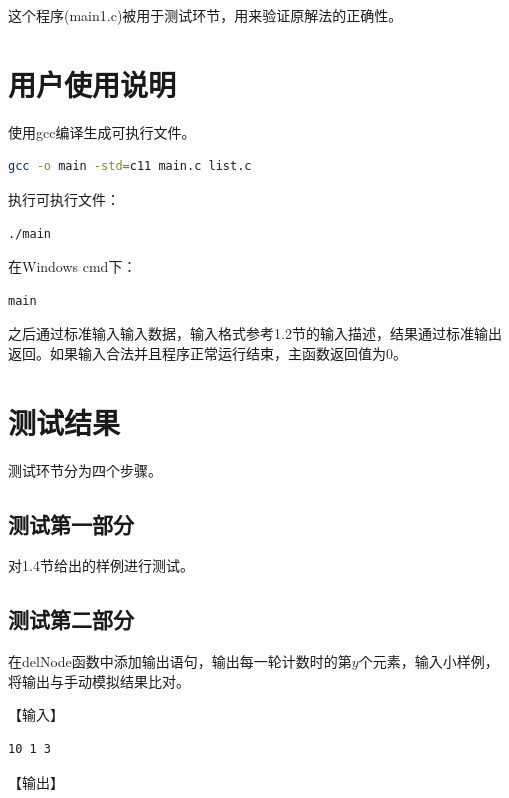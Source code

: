 \documentclass{article}
\begin{document}
这个程序(main1.c)被用于测试环节，用来验证原解法的正确性。

\section{用户使用说明}

使用gcc编译生成可执行文件。

\begin{lstlisting}[language={bash},
    basicstyle=\small\consolas]
gcc -o main -std=c11 main.c list.c
\end{lstlisting}

执行可执行文件：

\begin{lstlisting}[language={bash},
    basicstyle=\small\consolas]
./main
\end{lstlisting}

在Windows cmd下：

\begin{lstlisting}[language={bash},
    basicstyle=\small\consolas]
main
\end{lstlisting}

之后通过标准输入输入数据，输入格式参考1.2节的输入描述，结果通过标准输出返回。如果输入合法并且程序正常运行结束，主函数返回值为0。

\section{测试结果}

测试环节分为四个步骤。

\subsection{测试第一部分}

对1.4节给出的样例进行测试。

\subsection{测试第二部分}

在delNode函数中添加输出语句，输出每一轮计数时的第$y$个元素，输入小样例，将输出与手动模拟结果比对。

【输入】

\begin{lstlisting}[language={bash},
    basicstyle=\small\consolas]
10 1 3
\end{lstlisting}

【输出】
\end{document}
